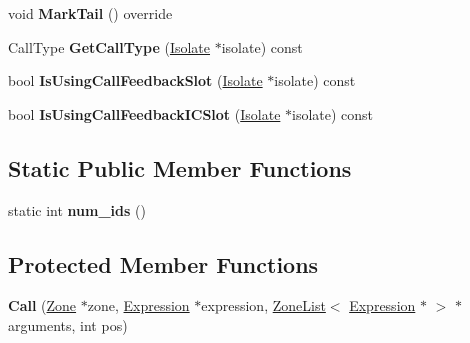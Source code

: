 \begin{DoxyCompactItemize}
\item 
void {\bfseries Mark\+Tail} () override\hypertarget{classv8_1_1internal_1_1_call_a84cc9660daadef55f86308ad0c436421}{}\label{classv8_1_1internal_1_1_call_a84cc9660daadef55f86308ad0c436421}

\item 
Call\+Type {\bfseries Get\+Call\+Type} (\hyperlink{classv8_1_1internal_1_1_isolate}{Isolate} $\ast$isolate) const \hypertarget{classv8_1_1internal_1_1_call_ad94e6f959c54f387ca57e0b4990931e1}{}\label{classv8_1_1internal_1_1_call_ad94e6f959c54f387ca57e0b4990931e1}

\item 
bool {\bfseries Is\+Using\+Call\+Feedback\+Slot} (\hyperlink{classv8_1_1internal_1_1_isolate}{Isolate} $\ast$isolate) const \hypertarget{classv8_1_1internal_1_1_call_ad89808f3bdea2d07bd1c20d0b8360b59}{}\label{classv8_1_1internal_1_1_call_ad89808f3bdea2d07bd1c20d0b8360b59}

\item 
bool {\bfseries Is\+Using\+Call\+Feedback\+I\+C\+Slot} (\hyperlink{classv8_1_1internal_1_1_isolate}{Isolate} $\ast$isolate) const \hypertarget{classv8_1_1internal_1_1_call_a27812965108534e552b1480f13b77c6a}{}\label{classv8_1_1internal_1_1_call_a27812965108534e552b1480f13b77c6a}

\end{DoxyCompactItemize}
\subsection*{Static Public Member Functions}
\begin{DoxyCompactItemize}
\item 
static int {\bfseries num\+\_\+ids} ()\hypertarget{classv8_1_1internal_1_1_call_a7bccb31cbecddd176b2a4eeb7d965359}{}\label{classv8_1_1internal_1_1_call_a7bccb31cbecddd176b2a4eeb7d965359}

\end{DoxyCompactItemize}
\subsection*{Protected Member Functions}
\begin{DoxyCompactItemize}
\item 
{\bfseries Call} (\hyperlink{classv8_1_1internal_1_1_zone}{Zone} $\ast$zone, \hyperlink{classv8_1_1internal_1_1_expression}{Expression} $\ast$expression, \hyperlink{classv8_1_1internal_1_1_zone_list}{Zone\+List}$<$ \hyperlink{classv8_1_1internal_1_1_expression}{Expression} $\ast$ $>$ $\ast$arguments, int pos)\hypertarget{classv8_1_1internal_1_1_call_a43a9222995c8980a585574cdc82640fb}{}\label{classv8_1_1internal_1_1_call_a43a9222995c8980a585574cdc82640fb}

\end{DoxyCompactItemize}
